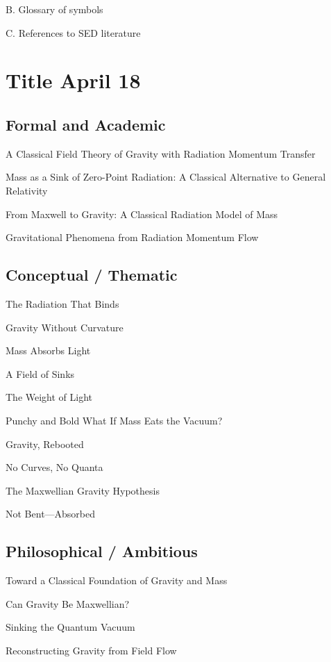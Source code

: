 \documentclass {article}
\begin{document}
B. Glossary of symbols

C. References to SED literature



\newpage



\section{Title April 18}

\subsection{Formal and Academic}
 
A Classical Field Theory of Gravity with Radiation Momentum Transfer

Mass as a Sink of Zero-Point Radiation: A Classical Alternative to General Relativity

From Maxwell to Gravity: A Classical Radiation Model of Mass

Gravitational Phenomena from Radiation Momentum Flow

\subsection{Conceptual / Thematic}


The Radiation That Binds

Gravity Without Curvature

Mass Absorbs Light

A Field of Sinks

The Weight of Light

Punchy and  Bold
What If Mass Eats the Vacuum?

Gravity, Rebooted

No Curves, No Quanta

The Maxwellian Gravity Hypothesis

Not Bent—Absorbed

\subsection{Philosophical / Ambitious}
 
 
Toward a Classical Foundation of Gravity and Mass

Can Gravity Be Maxwellian?

Sinking the Quantum Vacuum

Reconstructing Gravity from Field Flow
\end{document}
